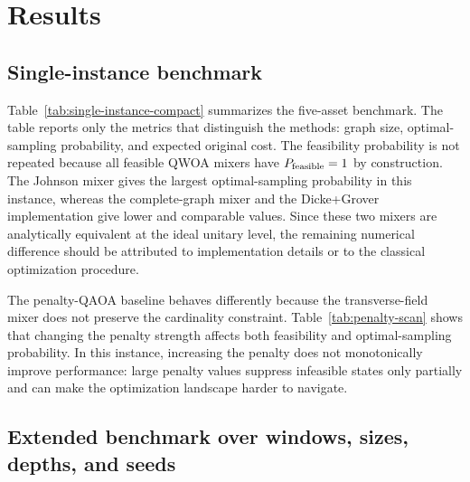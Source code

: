 \section{\label{sec:results}Results}

\subsection{Single-instance benchmark}

Table~\ref{tab:single-instance-compact} summarizes the five-asset benchmark.
The table reports only the metrics that distinguish the methods: graph size,
optimal-sampling probability, and expected original cost. The feasibility
probability is not repeated because all feasible QWOA mixers have
\(P_{\rm feasible}=1\) by construction. The Johnson mixer gives the largest optimal-sampling probability in this
instance, whereas the complete-graph mixer and the Dicke+Grover implementation 
give lower and comparable values. Since these two mixers are analytically
equivalent at the ideal unitary level, the remaining numerical difference
should be attributed to implementation details or to the classical optimization
procedure.



The penalty-QAOA baseline behaves differently because the transverse-field
mixer does not preserve the cardinality constraint. Table~\ref{tab:penalty-scan}
shows that changing the penalty strength affects both feasibility and
optimal-sampling probability. In this instance, increasing the penalty does not
monotonically improve performance: large penalty values suppress infeasible
states only partially and can make the optimization landscape harder to
navigate. 



\subsection{Extended benchmark over windows, sizes, depths, and seeds}

